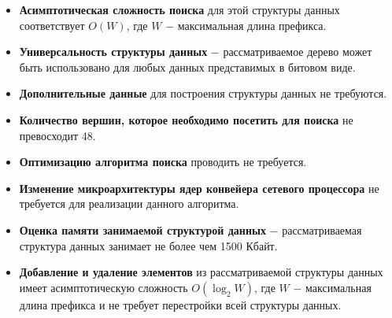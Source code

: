 \documentclass[a4paper, 12pt, titlepage, finall]{extreport}
\begin{document}
            \begin{itemize}
                \item\textbf{Асимптотическая сложность поиска} для этой структуры данных соответствует {\ttfamily $O(W)$},
                где {\ttfamily $W$} $-$ максимальная длина префикса.
                \item\textbf{Универсальность структуры данных} $-$ рассматриваемое дерево может быть использовано для любых данных представимых в битовом виде.
                \item\textbf{Дополнительные данные} для построения структуры данных не требуются.
                \item\textbf{Количество вершин, которое необходимо посетить для поиска} не превосходит 48.
                \item\textbf{Оптимизацию алгоритма поиска} проводить не требуется.
                \item\textbf{Изменение микроархитектуры ядер конвейера сетевого процессора} не требуется для реализации данного алгоритма.
               \item\textbf{Оценка памяти занимаемой структурой данных} $-$ рассматриваемая структура данных занимает не более чем 1500 Кбайт.
                \item\textbf{Добавление и удаление элементов} из рассматриваемой структуры данных имеет асимптотическую сложность 
                {\ttfamily $O(\log_2{W})$}, где {\ttfamily $W$} $-$ максимальная длина префикса и не требует перестройки всей структуры данных.
            \end{itemize}
\end{document}
